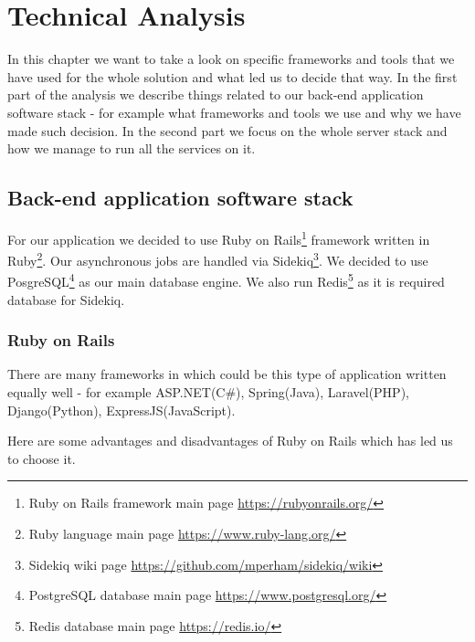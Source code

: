 
\chapter{Technical Analysis}
In this chapter we want to take a look on specific frameworks and tools that we have used for the whole solution and what led us to decide that way. In the first part of the analysis we describe things related to our back-end application software stack - for example what frameworks and tools we use and why we have made such decision. In the second part we focus on the whole server stack and how we manage to run all the services on it.
\section{Back-end application software stack}
For our application we decided to use Ruby on Rails\footnote{ Ruby on Rails framework main page \url{https://rubyonrails.org/}} framework written in Ruby\footnote{ Ruby language main page \url{https://www.ruby-lang.org/}}. 
Our asynchronous jobs are handled via Sidekiq\footnote{ Sidekiq wiki page \url{https://github.com/mperham/sidekiq/wiki}}. We decided to use PosgreSQL\footnote{ PostgreSQL database main page \url{https://www.postgresql.org/}} as our main database engine. We also run Redis\footnote{ Redis database main page \url{https://redis.io/}} as it is required database for Sidekiq.
\subsection{Ruby on Rails}
There are many frameworks in which could be this type of application written equally well - for example ASP.NET(C\#), Spring(Java), Laravel(PHP), Django(Python), ExpressJS(JavaScript).

Here are some advantages and disadvantages of Ruby on Rails which has led us to choose it.

